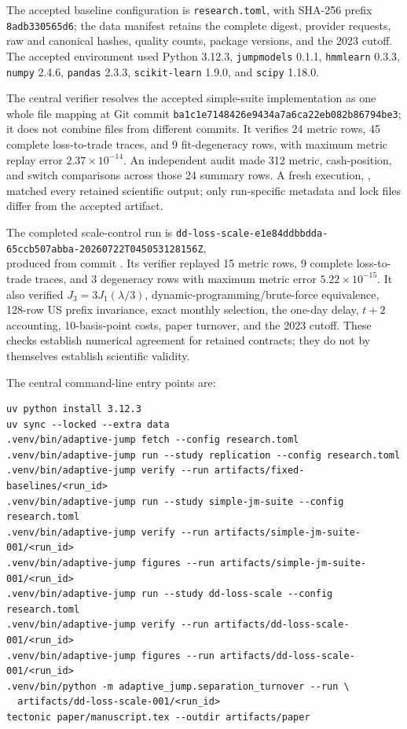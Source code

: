 \documentclass[11pt]{article}
\begin{document}
The accepted baseline configuration is \texttt{research.toml}, with SHA-256
prefix \texttt{8adb330565d6}; the data manifest retains the complete digest,
provider requests, raw and canonical hashes, quality counts, package versions,
and the 2023 cutoff. The accepted environment used
Python 3.12.3, \texttt{jumpmodels} 0.1.1, \texttt{hmmlearn} 0.3.3,
\texttt{numpy} 2.4.6, \texttt{pandas} 2.3.3, \texttt{scikit-learn} 1.9.0, and
\texttt{scipy} 1.18.0.

The central verifier resolves the accepted simple-suite implementation as one
whole file mapping at Git commit
\texttt{ba1c1e7148426e9434a7a6ca22eb082b86794be3}; it does not combine files
from different commits. It verifies 24 metric rows, 45 complete loss-to-trade
traces, and 9 fit-degeneracy rows, with maximum metric replay error
\(2.37\times10^{-14}\). An independent audit made 312 metric, cash-position,
and switch comparisons across those 24 summary rows. A fresh execution,
,
matched every retained scientific output; only run-specific metadata and lock
files differ from the accepted artifact.

The completed scale-control run is
\texttt{dd-loss-scale-e1e84ddbbdda-}\\
\texttt{65ccb507abba-20260722T045053128156Z},\\
produced from commit
. Its verifier replayed 15
metric rows, 9 complete loss-to-trade traces, and 3 degeneracy rows with
maximum metric error \(5.22\times10^{-15}\). It also verified
\(J_3=3J_1(\lambda/3)\), dynamic-programming/brute-force equivalence, 128-row
US prefix invariance, exact monthly selection, the one-day delay, \(t+2\)
accounting, 10-basis-point costs, paper turnover, and the 2023 cutoff. These
checks establish numerical agreement for retained contracts; they do not by
themselves establish scientific validity.

The central command-line entry points are:
\begin{verbatim}
uv python install 3.12.3
uv sync --locked --extra data
.venv/bin/adaptive-jump fetch --config research.toml
.venv/bin/adaptive-jump run --study replication --config research.toml
.venv/bin/adaptive-jump verify --run artifacts/fixed-baselines/<run_id>
.venv/bin/adaptive-jump run --study simple-jm-suite --config research.toml
.venv/bin/adaptive-jump verify --run artifacts/simple-jm-suite-001/<run_id>
.venv/bin/adaptive-jump figures --run artifacts/simple-jm-suite-001/<run_id>
.venv/bin/adaptive-jump run --study dd-loss-scale --config research.toml
.venv/bin/adaptive-jump verify --run artifacts/dd-loss-scale-001/<run_id>
.venv/bin/adaptive-jump figures --run artifacts/dd-loss-scale-001/<run_id>
.venv/bin/python -m adaptive_jump.separation_turnover --run \
  artifacts/dd-loss-scale-001/<run_id>
tectonic paper/manuscript.tex --outdir artifacts/paper
\end{verbatim}
\end{document}
